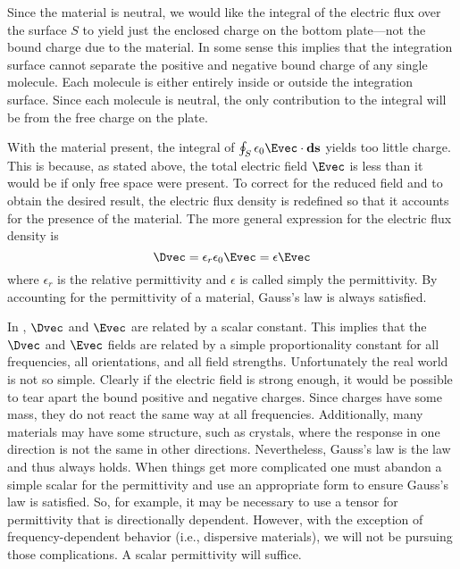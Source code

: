 Since the material is neutral, we would like the integral of the
electric flux over the surface $S$ to yield just the enclosed charge
on the bottom plate---not the bound charge due to the material.  In
some sense this implies that the integration surface cannot separate
the positive and negative bound charge of any single molecule.  Each
molecule is either entirely inside or outside the integration surface.
Since each molecule is neutral, the only contribution to the integral
will be from the free charge on the plate.

With the material present, the integral of $\oint_S
\epsilon_0\Evec\cdot \mathbf{ds}$ yields too little charge.  This is
because, as stated above, the total electric field $\Evec$ is less
than it would be if only free space were present.  To correct for the
reduced field and to obtain the desired result, the electric flux
density is redefined so that it accounts for the presence of the
material.  The more general expression for the electric flux density
is
\begin{equation}
 \Dvec = \epsilon_r\epsilon_0\Evec = \epsilon\Evec
 \label{eq:eAndD}
\end{equation}
where $\epsilon_r$ is the relative permittivity and $\epsilon$ is
called simply the permittivity.  By accounting for the permittivity of
a material, Gauss's law is always satisfied.

In , $\Dvec$ and $\Evec$ are related by a scalar
constant.  This implies that the $\Dvec$ and $\Evec$ fields are
related by a simple proportionality constant for all frequencies, all
orientations, and all field strengths.  Unfortunately the real world
is not so simple.  Clearly if the electric field is strong enough, it
would be possible to tear apart the bound positive and negative
charges.  Since charges have some mass, they do not react the same way
at all frequencies.  Additionally, many materials may have some
structure, such as crystals, where the response in one direction is
not the same in other directions.  Nevertheless, Gauss's law is the
law and thus always holds.  When things get more complicated one must
abandon a simple scalar for the permittivity and use an appropriate
form to ensure Gauss's law is satisfied.  So, for example, it may be
necessary to use a tensor for permittivity that is directionally
dependent.  However, with the exception of frequency-dependent
behavior (i.e., dispersive materials), we will not be pursuing those
complications.  A scalar permittivity will suffice.

